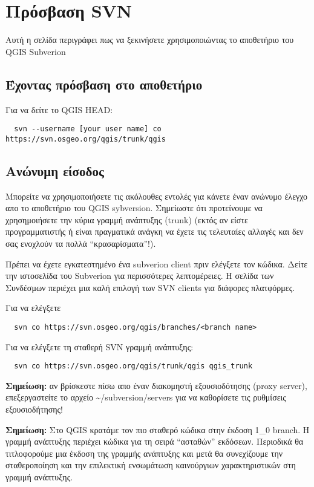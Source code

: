 \hypertarget{toc29}{}
\section{Πρόσβαση SVN}
Αυτή η σελίδα περιγράφει πως να ξεκινήσετε χρησιμοποιώντας το αποθετήριο του QGIS Subverion

\hypertarget{toc30}{}
\subsection{Έχοντας πρόσβαση στο αποθετήριο}
Για να δείτε το QGIS HEAD:

\begin{verbatim}
  svn --username [your user name] co https://svn.osgeo.org/qgis/trunk/qgis
\end{verbatim}

\hypertarget{toc31}{}
\subsection{Ανώνυμη είσοδος}
Μπορείτε να χρησιμοποιήσετε τις ακόλουθες εντολές για κάνετε έναν ανώνυμο έλεγχο απο το αποθετήριο του QGIS sybversion. Σημείωστε ότι προτείνουμε να χρησημοιήσετε την κύρια γραμμή ανάπτυξης (trunk) (εκτός αν είστε προγραμματιστής ή είναι πραγματικά ανάγκη να έχετε τις τελευταίες αλλαγές και δεν σας ενοχλούν τα πολλά “κρασαρίσματα”!).

Πρέπει να έχετε εγκατεστημένο ένα subverion client πριν ελέγξετε τον κώδικα. Δείτε την ιστοσελίδα του Subverion για περισσότερες λεπτομέρειες. Η σελίδα των Συνδέσμων περιέχει μια καλή επιλογή των SVN clients για διάφορες πλατφόρμες.

Για να ελέγξετε

\begin{verbatim}
  svn co https://svn.osgeo.org/qgis/branches/<branch name>
\end{verbatim}

Για να ελέγξετε τη σταθερή SVN γραμμή ανάπτυξης:

\begin{verbatim}
  svn co https://svn.osgeo.org/qgis/trunk/qgis qgis_trunk
\end{verbatim}

\textbf{Σημείωση:} αν βρίσκεστε πίσω απο έναν διακομηστή εξουσιοδότησης (proxy server), επεξεργαστείτε το αρχείο \~{}/subversion/servers
για να καθορίσετε τις ρυθμίσεις εξουσιοδήτησης!

\textbf{Σημείωση:} Στο QGIS κρατάμε τον πιο σταθερό κώδικα στην έκδοση 1\_0 branch.
Η γραμμή ανάπτυξης περιέχει κώδικα για τη σειρά “ασταθών” εκδόσεων. Περιοδικά θα τιτλοφορούμε μια έκδοση της γραμμής ανάπτυξης και μετά θα συνεχίζουμε την σταθεροποίηση και την επιλεκτική ενσωμάτωση καινούργιων χαρακτηριστικών στη γραμμή ανάπτυξης.

